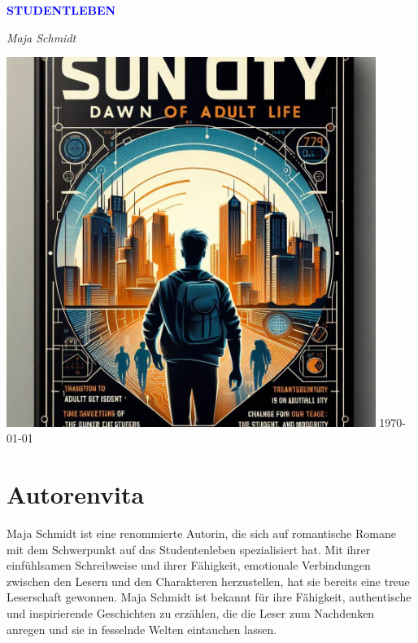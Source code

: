 \documentclass[12pt]{article} %
\begin{document}
\begin{titlepage}
    \centering
    \vspace*{3cm}
    {\Huge\bfseries\textcolor{blue}{\MakeUppercase{ Studentleben }}\par} %
    \vspace{0.5cm} %
    {\Large\textit{ Maja Schmidt }\par} %
    \vfill
    \includegraphics[width=0.9\textwidth]{ cover.jpg } %
    \vfill
    \today
\end{titlepage}

\section*{Autorenvita}
\vspace{4cm} %
Maja Schmidt ist eine renommierte Autorin, die sich auf romantische Romane mit dem Schwerpunkt auf das Studentenleben spezialisiert hat. Mit ihrer einfühlsamen Schreibweise und ihrer Fähigkeit, emotionale Verbindungen zwischen den Lesern und den Charakteren herzustellen, hat sie bereits eine treue Leserschaft gewonnen. Maja Schmidt ist bekannt für ihre Fähigkeit, authentische und inspirierende Geschichten zu erzählen, die die Leser zum Nachdenken anregen und sie in fesselnde Welten eintauchen lassen.
\end{document}
